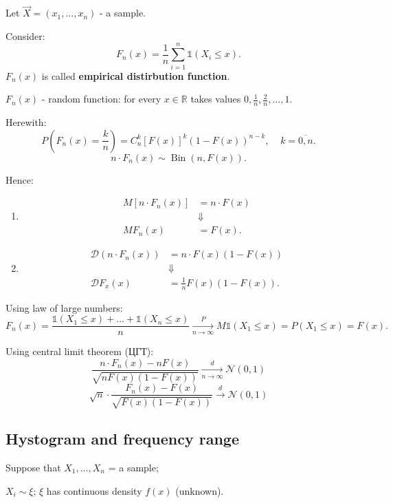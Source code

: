 Let $\vec{X} = \left(  x_1, \ldots, x_n \right) $ - a sample.

Consider:
\[
F_n(x) = \frac{1}{n} \sum_{i=1}^{n}  \mathds{1}\left(X_i \leq x\right)
.\] 
$F_n(x)$ is called \textbf{empirical distirbution function}.

$F_n(x)$ - random function: for every  $x \in \mathbb{R}$ takes values $0, \frac{1}{n}, \frac{2}{n}, \ldots, 1$.

Herewith:
\[
P\left( F_n (x) = \frac{k}{n} \right) = C_n^k \left[ F(x) \right] ^k
(1 - F(x))^{n-k}, \;\;\;\; k = \overline{0, n}
.\] 
\[
    n \cdot F_n(x) \sim \operatorname{Bin} (n, F(x))
.\] 

Hence:
\begin{enumerate}
    \item
        \begin{align*}
            M \left[ n \cdot F_n(x) \right] &= n \cdot F(x) \\
                             &\Downarrow \\
            M F_n(x)         &= F(x)
        .\end{align*}

    \item
        \begin{align*}
            \mathcal{D}(n \cdot F_n(x)) &= n \cdot F(x) (1-F(x)) \\
                                        &\Downarrow \\
            \mathcal{D}F_x(x) &= \frac{1}{n} F(x) (1-F(x))
        .\end{align*}
\end{enumerate}

Using law of large numbers:
\[
F_n(x) = \frac{\mathds{1}(X_1 \leq x) + \ldots + \mathds{1} (X_n \leq x)}{n}
\underset{n \to \infty}{\overset{P}{\to}}
M \mathds{1}(X_1 \leq x) = P(X_1 \leq x) = F(x)
.\] 

Using central limit theorem (ЦГТ):
\[
\frac{n \cdot F_n(x) - n F(x)}{\sqrt{nF(x) (1-F(x))} }
\underset{n\to\infty}{\overset{d}{\to}}
\mathcal{N}(0, 1)
\] 
\[
\sqrt{n} \cdot \frac{F_n(x) - F(x)}{\sqrt{F(x)(1-F(x))}}
\overset{d}{\to}
\mathcal{N}(0,1)
\] 



\subsection{Hystogram and frequency range}
Suppose that $X_1, \ldots, X_n$ = a sample;

$X_i \sim \xi$;  $\xi$ has continuous density $f(x)$ (unknown).

